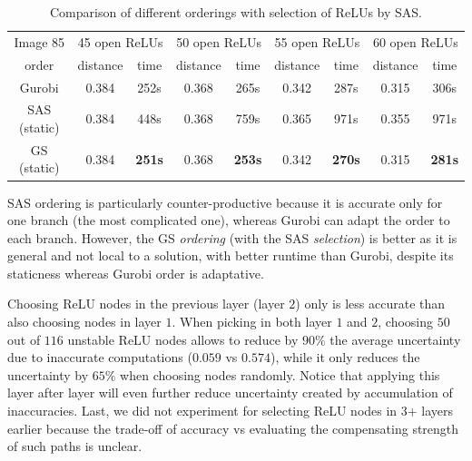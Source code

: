 \begin{table}[t!]	
	\centering
	\caption{Comparison of different orderings with selection of ReLUs by {\sf SAS}.
	}
	\label{table.order}
	\begin{tabular}{|c||c c|c c|c c|c c|}
		\hline
		  Image 85& \multicolumn{2}{c|}{45 open ReLUs} & \multicolumn{2}{c|}{50 open ReLUs} 
		  & \multicolumn{2}{c|}{55 open ReLUs} & \multicolumn{2}{c|}{60 open ReLUs}\\ 
		 order & distance & time & distance & time & distance & time & distance & time \\
		\hline \hline
		Gurobi & 0.384 & 252s & 0.368&265s  &0.342 & 287s& 0.315  & 306s  \\ 
		{\sf SAS} (static) & 0.384 & 448s & 0.368&759s  &0.365 &971s & 0.355  & 971s \\
		{\sf GS} (static) & 0.384 & {\bf 251s} &0.368 &{\bf 253s}  & 0.342 &{\bf 270s} & 0.315 & {\bf 281s} \\ \hline
	\end{tabular}
\end{table}

{\sf SAS} ordering is particularly counter-productive because it is accurate only for one branch (the most complicated one), whereas Gurobi can adapt the order to each branch.
However, the GS {\em ordering} (with the {\sf SAS} {\em selection}) is better as it is general and not local to a solution, with better runtime than Gurobi, despite its staticness whereas Gurobi order is adaptative.

\iffalse
Choosing ReLU nodes in the previous layer (layer $2$) only is less accurate than 
also choosing nodes in layer $1$. When picking in both layer $1$ and $2$, choosing $50$ out of $116$ unstable ReLU nodes allows to reduce by $90\%$ the average uncertainty due to inaccurate computations ($0.059$ vs $0.574$), while it only reduces the uncertainty by $65\%$ when choosing nodes randomly. Notice that applying this layer after layer will even further reduce uncertainty created by accumulation of inaccuracies. 
Last, we did not experiment for selecting ReLU nodes in 3+ layers earlier because the trade-off of accuracy vs evaluating the compensating strength of such paths is unclear.

